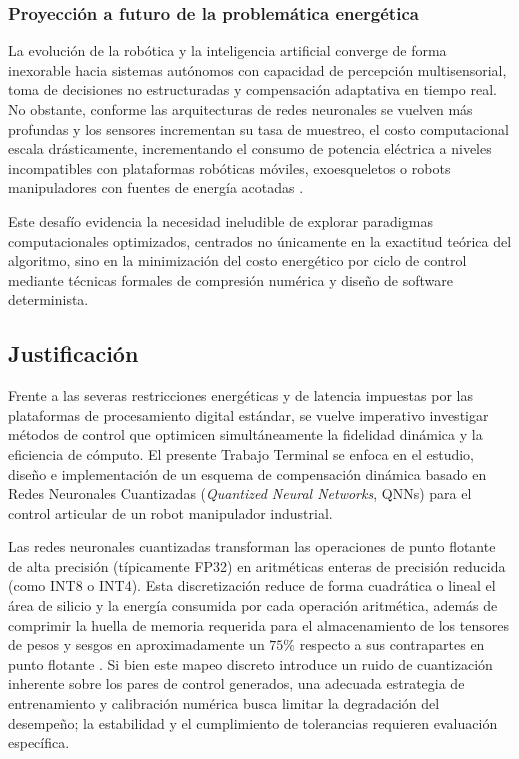 \documentclass[12pt]{article}
\begin{document}
\subsubsection*{Proyección a futuro de la problemática energética}
La evolución de la robótica y la inteligencia artificial converge de forma inexorable hacia sistemas autónomos con capacidad de percepción multisensorial, toma de decisiones no estructuradas y compensación adaptativa en tiempo real. No obstante, conforme las arquitecturas de redes neuronales se vuelven más profundas y los sensores incrementan su tasa de muestreo, el costo computacional escala drásticamente, incrementando el consumo de potencia eléctrica a niveles incompatibles con plataformas robóticas móviles, exoesqueletos o robots manipuladores con fuentes de energía acotadas \cite{Bartolozzi2022embodied, deVriesGao2025AIenergy, DomingoReguero2025EnergyEfficient}.

Este desafío evidencia la necesidad ineludible de explorar paradigmas computacionales optimizados, centrados no únicamente en la exactitud teórica del algoritmo, sino en la minimización del costo energético por ciclo de control mediante técnicas formales de compresión numérica y diseño de software determinista.

\subsection*{Justificación}
Frente a las severas restricciones energéticas y de latencia impuestas por las plataformas de procesamiento digital estándar, se vuelve imperativo investigar métodos de control que optimicen simultáneamente la fidelidad dinámica y la eficiencia de cómputo. El presente Trabajo Terminal se enfoca en el estudio, diseño e implementación de un esquema de compensación dinámica basado en Redes Neuronales Cuantizadas (\textit{Quantized Neural Networks}, QNNs) para el control articular de un robot manipulador industrial.

Las redes neuronales cuantizadas transforman las operaciones de punto flotante de alta precisión (típicamente FP32) en aritméticas enteras de precisión reducida (como INT8 o INT4). Esta discretización reduce de forma cuadrática o lineal el área de silicio y la energía consumida por cada operación aritmética, además de comprimir la huella de memoria requerida para el almacenamiento de los tensores de pesos y sesgos en aproximadamente un $75\%$ respecto a sus contrapartes en punto flotante \cite{Zhang2025jlpea, Jiang2023SingleShot, Liang2021PruningSurvey}. Si bien este mapeo discreto introduce un ruido de cuantización inherente sobre los pares de control generados, una adecuada estrategia de entrenamiento y calibración numérica busca limitar la degradación del desempeño; la estabilidad y el cumplimiento de tolerancias requieren evaluación específica.
\end{document}

